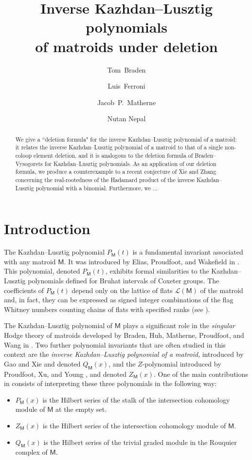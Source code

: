 \documentclass[11pt, a4paper, english]{amsart}
\title{Inverse Kazhdan--Lusztig polynomials\\ of matroids under deletion}
\author[T.~Braden]
{Tom~Braden}
\author[L.~Ferroni]{Luis~Ferroni}
\author[J.~P.~Matherne]{Jacob~P.~Matherne}
\author[N.~Nepal]{Nutan Nepal}
\theoremstyle{teoremas}
\theoremstyle{definition}
\newcommand{\M}{\mathsf{M}}
\begin{document}
\begin{abstract}
    We give a ``deletion formula" for the inverse Kazhdan--Lusztig polynomial of a matroid: it relates the inverse Kazhdan--Lusztig polynomial of a matroid to that of a single non-coloop element deletion, and it is analogous to the deletion formula of Braden--Vysogorets for Kazhdan--Lusztig polynomials.  As an application of our deletion formula, we produce a counterexample to a recent conjecture of Xie and Zhang concerning the real-rootedness of the Hadamard product of the inverse Kazhdan--Lusztig polynomial with a binomial.  \textcolor{Bittersweet}{Furthermore, we ...}
\end{abstract}

\maketitle

\section{Introduction}

The Kazhdan--Lusztig polynomial $P_{\M}(t)$ is a fundamental invariant associated with any matroid $\M$. It was introduced by Elias, Proudfoot, and Wakefield in \cite{EPW16}. This polynomial, denoted $P_{\M}(t)$, exhibits formal similarities to the Kazhdan--Lusztig polynomials defined for Bruhat intervals of Coxeter groups. The coefficients of $P_{\M}(t)$ depend only on the lattice of flats $\mathcal{L}(\M)$ of the matroid and, in fact, they can be expressed as signed integer combinations of the flag Whitney numbers counting chains of flats with specified ranks (see \cite{proudfoot-xu-young}).

The Kazhdan--Lusztig polynomial of $\M$ plays a significant role in the \emph{singular} Hodge theory of matroids developed by Braden, Huh, Matherne, Proudfoot, and Wang in \cite{braden-huh-matherne-proudfoot-wang}. Two further polynomial invariants that are often studied in this context are the \emph{inverse Kazhdan--Lusztig polynomial of a matroid}, introduced by Gao and Xie \cite{gao-xie} and denoted $Q_{\M}(x)$, and the $Z$-polynomial introduced by Proudfoot, Xu, and Young \cite{proudfoot-xu-young}, and denoted $Z_{\M}(x)$. One of the main contributions in \cite{braden-huh-matherne-proudfoot-wang} consists of interpreting these three polynomials in the following way:
\begin{itemize}
    \item $P_{\M}(x)$ is the Hilbert series of the stalk of the intersection cohomology module of $\M$ at the empty set.
    \item $Z_{\M}(x)$ is the Hilbert series of the intersection cohomology module of $\M$.
    \item $Q_{\M}(x)$ is the Hilbert series of the trivial graded module in the Rouquier complex of $\M$.
\end{itemize}
\end{document}
